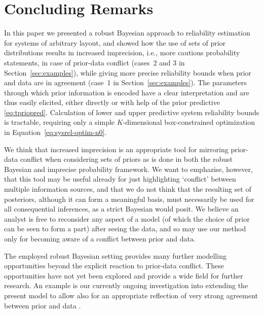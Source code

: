 \documentclass[Journal,SectionNumbers,InsideFigs]{ascelike}
\begin{document}
\section{Concluding Remarks}
\label{sec:concluding}

In this paper we presented a robust Bayesian approach to reliability estimation for systems of arbitrary layout,
and showed how the use of sets of prior distributions results in increased imprecision,
i.e., more cautious probability statements, in case of prior-data conflict (cases~2 and 3 in Section~\ref{sec:examples}),
while giving more precise reliability bounds when prior and data are in agreement (case~1 in Section~\ref{sec:examples}).
The parameters through which prior information is encoded have a clear interpretation
and are thus easily elicited, either directly or with help of the prior predictive \eqref{eq:tpriopred}.
Calculation of lower and upper predictive system reliability bounds is tractable,
requiring only a simple $K$-dimensional box-constrained optimization in Equation~\eqref{eq:sysrel-optim-n0}.

We think that increased imprecision is an appropriate tool for mirroring prior-data conflict
when considering sets of priors as is done in both the robust Bayesian and imprecise probability framework.
We want to emphazise, however, that this tool may be useful already
for just highlighting `conflict' between multiple information sources,
and that we do not think that the resulting set of posteriors,
although it can form a meaningful basis, must necessarily be used
for all consequential inferences, as a strict Bayesian would posit.
We believe an analyst is free to reconsider any aspect of a model
(of which the choice of prior can be seen to form a part) after seeing the data,
and so may use our method only for becoming aware of a conflict between prior and data.

The employed robust Bayesian setting provides many further modelling opportunities
beyond the explicit reaction to prior-data conflict.
These opportunities have not yet been explored and
provide a wide field for further research.
An example is our currently ongoing investigation into
extending the present model to allow also for an appropriate reflection of very strong agreement between prior and data
\cite{ipmu2016}.
\end{document}
